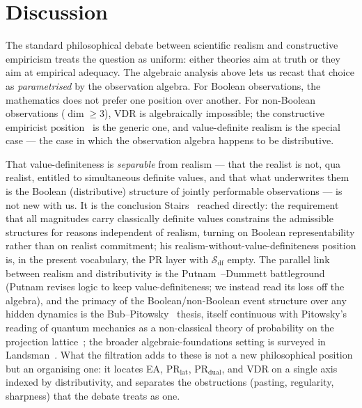 \section{Discussion}
\label{sec:discussion}

The standard philosophical debate between scientific realism and
constructive empiricism treats the question as uniform: either
theories aim at truth or they aim at empirical adequacy.  The
algebraic analysis above lets us recast that choice as
\emph{parametrised} by the observation algebra.  For Boolean
observations, the mathematics does not prefer one position over
another.  For non-Boolean observations ($\dim \geq 3$), VDR is
algebraically impossible; the constructive empiricist
position~\cite{vanFraassen1980} is the generic one, and
value-definite realism is the special case --- the case in which
the observation algebra happens to be distributive.

That value-definiteness is \emph{separable} from realism --- that the
realist is not, qua realist, entitled to simultaneous definite values,
and that what underwrites them is the Boolean (distributive) structure
of jointly performable observations --- is not new with us.  It is the
conclusion Stairs~\cite{Stairs1983} reached directly: the requirement
that all magnitudes carry classically definite values constrains the
admissible structures for reasons independent of realism, turning on
Boolean representability rather than on realist commitment; his
realism-without-value-definiteness position is, in the present
vocabulary, the $\text{PR}$ layer with $\mathcal{S}_{\mathrm{df}}$
empty.  The parallel link between realism and distributivity is the
Putnam~\cite{Putnam1968}--Dummett battleground (Putnam revises logic to
keep value-definiteness; we instead read its loss off the algebra), and
the primacy of the Boolean/non-Boolean event structure over any hidden
dynamics is the Bub--Pitowsky~\cite{BubPitowsky2010} thesis, itself
continuous with Pitowsky's reading of quantum mechanics as a
non-classical theory of probability on the projection
lattice~\cite{Pitowsky2006}; the broader algebraic-foundations setting
is surveyed in Landsman~\cite{Landsman2017}.  What the
filtration adds to these is not a new philosophical position but an
organising one: it locates EA, $\text{PR}_{\text{lat}}$,
$\text{PR}_{\text{dual}}$, and VDR on a single axis indexed by
distributivity, and separates the obstructions (pasting, regularity,
sharpness) that the debate treats as one.


